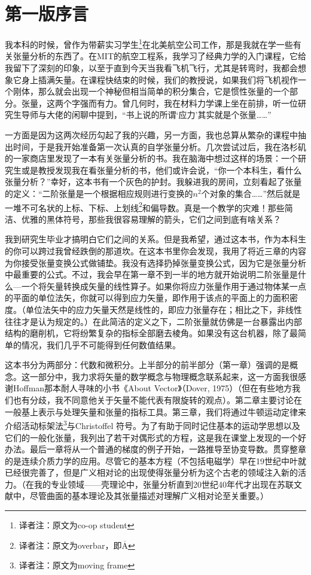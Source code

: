 \chapter*{第一版序言}
我本科的时候，曾作为带薪实习学生\footnote{译者注：原文为co-op student}在北美航空公司工作，那是我就在学一些有关张量分析的东西了。在MIT的航空工程系，我学习了经典力学的入门课程，它给我留下了深刻的印象，以至于直到今天当我看飞机飞行，尤其是转弯时，我都会想象它身上插满矢量。在课程快结束的时候，我们的教授说，如果我们将飞机视作一个刚体，那么就会出现一个神秘但相当简单的积分集合，它是惯性张量的一个部分。张量，这两个字强而有力。曾几何时，我在材料力学课上坐在前排，听一位研究生导师与大佬的闲聊中提到，“书上说的所谓‘应力’其实就是个张量……”

一方面是因为这两次经历勾起了我的兴趣，另一方面，我也总算从繁杂的课程中抽出时间，于是我开始准备第一次认真的自学张量分析。几次尝试过后，我在洛杉矶的一家商店里发现了一本有关张量分析的书。我在脑海中想过这样的场景：一个研究生或是教授发现我在看张量分析的书，他们或许会说，“你一个本科生，看什么张量分析？”幸好，这本书有一个灰色的护封。我躲进我的房间，立刻看起了张量的定义：“二阶张量是一个根据相应规则进行变换的$n^2$个对象的集合……”然后就是一堆不可名状的上标、下标、上划线\footnote{译者注：原文为overbar，即$\overline{\mathrm{A}}$}和偏导数。真是一个教学的灾难！那些简洁、优雅的黑体符号，那些我很容易理解的箭头，它们之间到底有啥关系？

我到研究生毕业才搞明白它们之间的关系。但是我希望，通过这本书，作为本科生的你可以跨过我曾经跌倒的那道坎。在这本书里你会发现，我用了将近三章的内容为你接受张量变换公式做铺垫。我没有选择扔掉张量变换公式，因为它是张量分析中最重要的公式。不过，我会早在第一章不到一半的地方就开始说明二阶张量是什么---一个将矢量转换成矢量的线性算子。如果你将应力张量作用于通过物体某一点的平面的单位法矢，你就可以得到应力矢量，即作用于该点的平面上的力面积密度。（单位法矢中的应力矢量天然是线性的，即应力张量存在；相比之下，非线性往往才是认为规定的。）在此简洁的定义之下，二阶张量就仿佛是一台暴露出内部结构的磨削机，它将纷繁复杂的指标全部磨去棱角。如果没有这台机器，除了最简单的情况，我们几乎不可能得到任何数值结果。

这本书分为两部分：代数和微积分。上半部分的前半部分（第一章）强调的是概念。这一部分中，我力求将矢量的数学概念与物理概念联系起来，这一方面我很感谢Hoffman那本耐人寻味的小书《About Vector》（Dover, 1975）（但在有些地方我们也有分歧，我不同意他关于矢量不能代表有限旋转的观点）。第二章主要讨论在一般基上表示与处理矢量和张量的指标工具。第三章，我们将通过牛顿运动定律来介绍活动标架法\footnote{译者注：原文为moving frame}与Christoffel 符号。为了有助于同时记住基本的运动学思想以及它们的一般化张量，我列出了若干对偶形式的方程，这是我在课堂上发现的一个好办法。最后一章将从一个普通的梯度的例子开始，一路推导至协变导数。贯穿整章的是连续介质力学的应用。尽管它的基本方程（不包括电磁学）早在19世纪中叶就已经很完善了，但是广义相对论的出现使得张量分析为这个古老的领域注入新的活力。（在我的专业领域------壳理论中，张量分析直到20世纪40年代才出现在苏联文献中，尽管曲面的基本理论及其张量描述对理解广义相对论至关重要。）

